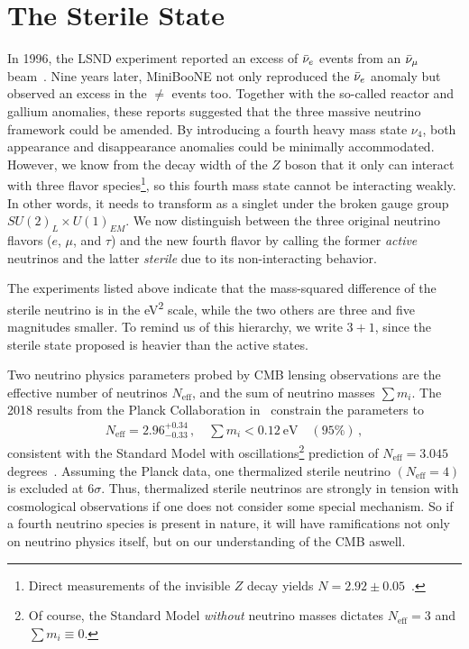 %
%
\section{The Sterile State}\label{sec:anomalies}
In 1996, the LSND experiment reported an excess of $\bar{\nu}_e$ events from an $\bar{\nu}_\mu$ beam~\cite{lsnd}.  
Nine years later, MiniBooNE not only reproduced the $\bar{\nu}_e$ anomaly but observed an excess in the
$\ne$ events too. Together with the so-called reactor and gallium anomalies, these reports suggested 
that the three massive neutrino framework could be amended.
By introducing a fourth heavy mass state $\nu_4$, both appearance and disappearance anomalies could be minimally accommodated.
However, we know from the decay width of the $Z$ boson that it only can interact with three flavor species\footnote{
    Direct measurements of the invisible $Z$ decay yields $N=2.92 \pm 0.05$~\cite{pdg}.
}, 
so this fourth mass state cannot be interacting weakly. In other words, it needs to transform as a
singlet under the broken gauge group $SU(2)_L \times U(1)_{EM}$.
We now distinguish between the three original neutrino flavors ($e$, $\mu$, and $\tau$) and the new fourth 
flavor by calling the former \emph{active} neutrinos
and the latter \emph{sterile} due to its non-interacting behavior.

The experiments listed above indicate that the mass-squared difference of the 
sterile neutrino is in the \si{\eV\squared} scale, while the two others
are three and five magnitudes smaller. To remind us of this hierarchy, we write $3+1$, since the sterile state 
proposed is heavier than the active states.


Two neutrino physics parameters probed by CMB lensing observations are the effective number of neutrinos
$N_\text{eff}$, and the sum of neutrino masses $\sum m_i$. 
The 2018 results from the Planck Collaboration in~\cite{planck2018} constrain the parameters to 
\begin{align}
    N_\text{eff} = 2.96^{+0.34}_{-0.33}\,, \quad \sum m_i < \SI{0.12}{\eV} \quad (95\%)\,,
\end{align}
consistent with the Standard Model with oscillations\footnote{Of course, the 
Standard Model \emph{without} neutrino masses dictates $N_\text{eff} = 3$ and $\sum m_i \equiv 0$.} prediction of $N_\text{eff} = 3.045$ degrees~\cite{desalas2016}.
Assuming the Planck data, one thermalized sterile neutrino $(N_\text{eff} = 4)$ is excluded at $6\sigma$. 
Thus, thermalized sterile 
neutrinos are strongly in tension with cosmological observations if one does not consider some special mechanism.
So if a fourth neutrino species is present in nature, it will have ramifications not only on neutrino physics itself, but on
our understanding of the CMB aswell.


